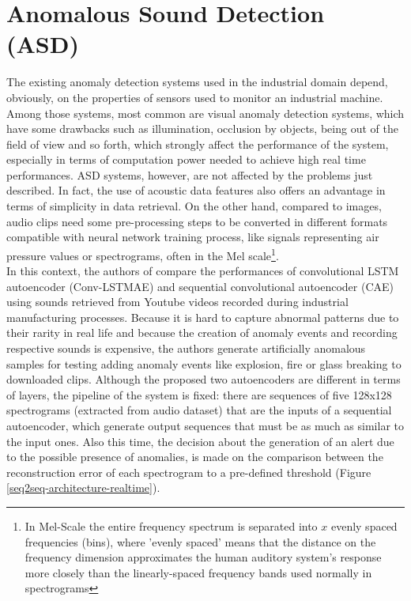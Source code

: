 \section{Anomalous Sound Detection (ASD)}
The existing anomaly detection systems used in the industrial domain depend, obviously, on the properties of sensors used to monitor an industrial machine. Among those systems, most common are visual anomaly detection systems, which have some drawbacks such as illumination, occlusion by objects, being out of the field of view and so forth, which strongly affect the performance of the system, especially in terms of computation power needed to achieve high real time performances. ASD systems, however, are not affected by the problems just described. In fact, the use of acoustic data features also offers an advantage in terms of simplicity in data retrieval. On the other hand, compared to images, audio clips need some pre-processing steps to be converted in different formats compatible with neural network training process, like signals representing air pressure values or spectrograms, often in the Mel scale\footnote{In Mel-Scale the entire frequency spectrum is separated into $x$ evenly spaced frequencies (bins), where 'evenly spaced' means that the distance on the frequency dimension approximates the human auditory system’s response more closely than the linearly-spaced frequency bands used normally in spectrograms}.\\
In this context, the authors of \cite{13RealTimeDetectionUsingSequentialAutoencoder} compare the performances of convolutional LSTM autoencoder (Conv-LSTMAE)  and sequential convolutional autoencoder (CAE) using sounds retrieved from Youtube videos recorded during industrial manufacturing processes. Because it is hard to capture abnormal patterns due to their rarity in real life and because the creation of anomaly events and recording respective sounds is expensive, the authors generate artificially anomalous samples for testing adding anomaly events like explosion, fire or glass breaking to downloaded clips. Although the proposed two autoencoders are different in terms of layers, the pipeline of the system is fixed: there are sequences of five 128x128 spectrograms (extracted from audio dataset) that are the inputs of a sequential autoencoder, which generate output sequences that must be as much as similar to the input ones. Also this time, the decision about the generation of an alert due to the possible presence of anomalies, is made on the comparison between the reconstruction error of each spectrogram to a pre-defined threshold (Figure \ref{seq2seq-architecture-realtime}).

